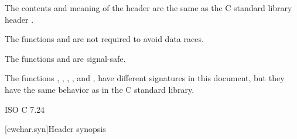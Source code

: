 \pnum
{}%
The contents and meaning of the header 
are the same as the C standard library header .

\pnum
The functions  and  are not required to avoid data
races.

\pnum
{}%
%
The functions  and  are signal-safe.

\pnum
\begin{note}
The functions
, , , , and ,
have different signatures in this document,
but they have the same behavior as in the C standard library.
\end{note}

\xref ISO C 7.24

[cwchar.syn]{Header  synopsis}

